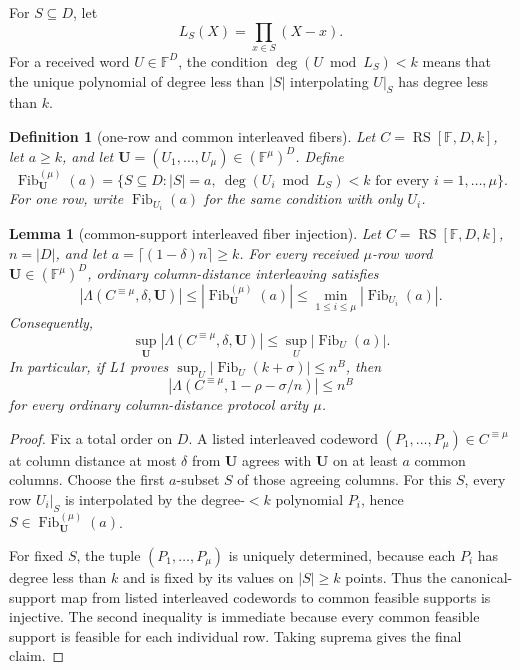 \documentclass[11pt]{article}
\newtheorem{lemma}{Lemma}
\newtheorem{definition}{Definition}
\newcommand{\F}{\mathbb F}
\newcommand{\RS}{\operatorname{RS}}
\newcommand{\Fib}{\operatorname{Fib}}
\newcommand{\Lam}{\Lambda}
\begin{document}
For \(S\subseteq D\), let
\[
  L_S(X)=\prod_{x\in S}(X-x).
\]
For a received word \(U\in\F^D\), the condition \(\deg(U\bmod L_S)<k\) means
that the unique polynomial of degree less than \(|S|\) interpolating \(U|_S\)
has degree less than \(k\).

\begin{definition}[one-row and common interleaved fibers]
Let \(C=\RS[\F,D,k]\), let \(a\ge k\), and let
\(\mathbf U=(U_1,\ldots,U_\mu)\in(\F^\mu)^D\).  Define
\[
  \Fib^{(\mu)}_{\mathbf U}(a)
  =
  \{S\subseteq D:
    |S|=a,\ \deg(U_i\bmod L_S)<k
    \text{ for every }i=1,\ldots,\mu\}.
\]
For one row, write \(\Fib_{U_i}(a)\) for the same condition with only \(U_i\).
\end{definition}

\begin{lemma}[common-support interleaved fiber injection]
\label{lem:common-support-interleaved-fiber-injection}
Let \(C=\RS[\F,D,k]\), \(n=|D|\), and let
\(a=\lceil(1-\delta)n\rceil\ge k\).  For every received \(\mu\)-row word
\(\mathbf U\in(\F^\mu)^D\), ordinary column-distance interleaving satisfies
\[
  |\Lam(C^{\equiv\mu},\delta,\mathbf U)|
  \le |\Fib^{(\mu)}_{\mathbf U}(a)|
  \le \min_{1\le i\le\mu}|\Fib_{U_i}(a)|.
\]
Consequently,
\[
  \sup_{\mathbf U}|\Lam(C^{\equiv\mu},\delta,\mathbf U)|
  \le \sup_U |\Fib_U(a)|.
\]
In particular, if L1 proves \(\sup_U|\Fib_U(k+\sigma)|\le n^B\), then
\[
  |\Lam(C^{\equiv\mu},1-\rho-\sigma/n)|\le n^B
\]
for every ordinary column-distance protocol arity \(\mu\).
\end{lemma}

\begin{proof}
Fix a total order on \(D\).  A listed interleaved codeword
\((P_1,\ldots,P_\mu)\in C^{\equiv\mu}\) at column distance at most \(\delta\) from
\(\mathbf U\) agrees with \(\mathbf U\) on at least \(a\) common columns.  Choose
the first \(a\)-subset \(S\) of those agreeing columns.  For this \(S\), every
row \(U_i|_S\) is interpolated by the degree-\(<k\) polynomial \(P_i\), hence
\(S\in\Fib^{(\mu)}_{\mathbf U}(a)\).

For fixed \(S\), the tuple \((P_1,\ldots,P_\mu)\) is uniquely determined,
because each \(P_i\) has degree less than \(k\) and is fixed by its values on
\(|S|\ge k\) points.  Thus the canonical-support map from listed interleaved
codewords to common feasible supports is injective.  The second inequality is
immediate because every common feasible support is feasible for each individual
row.  Taking suprema gives the final claim.
\end{proof}
\end{document}
